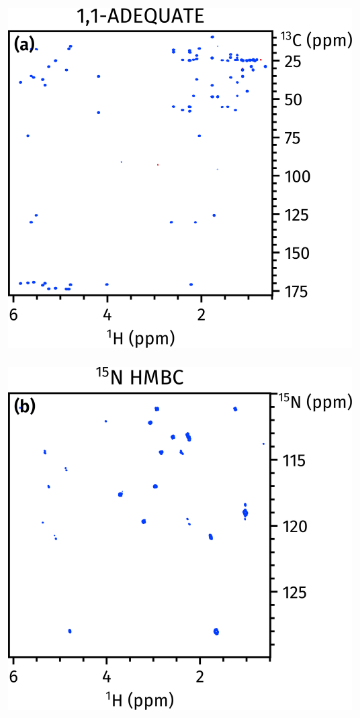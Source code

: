 \documentclass[a4paper,12pt]{article}
\begin{document}
\begin{refsection}
\begin{figure}[htb]
    \begin{subfigure}[b]{\textwidth}
        \centering
        \includegraphics[]{abbss_1.png}%
    \end{subfigure}
\end{figure}
\begin{figure}[htb]
    \ContinuedFloat
    \begin{subfigure}[b]{\textwidth}
        \centering
        \includegraphics[]{abbss_2.png}%

\end{subfigure}
\end{figure}
\end{refsection}
\end{document}
